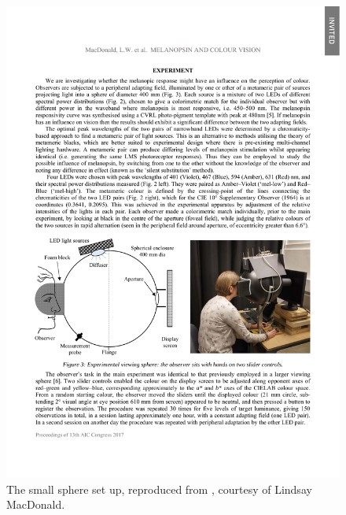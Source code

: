 \begin{figure}[htbp]
\includegraphics[max width=\textwidth,center]{figs/SmallSphere/diagram.pdf}
\caption{The small sphere set up, reproduced from \citet{macdonald_melanopsin_2017}, courtesy of Lindsay MacDonald.}
\label{fig:diagram}
\end{figure}

